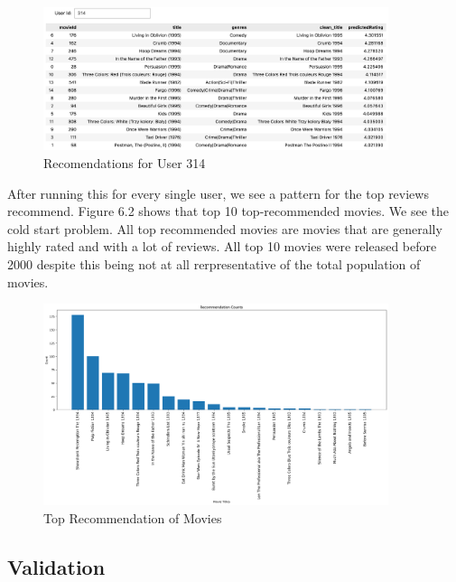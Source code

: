 \documentclass[12pt]{article}
\numberwithin{equation}{section}
\begin{document}
\begin{figure}[h!]
    \begin{minipage}[b]{01\linewidth}
         \centering
  	\includegraphics[width=0.9\textwidth]{314_recs}
  	\caption{Recomendations for User 314}
  	\label{fig:UN_degreeinfo}
    \end{minipage}
\end{figure}

After running this for every single user, we see a pattern for the top reviews recommend. Figure 6.2 shows that top 10 top-recommended movies. We see the cold start problem. All top recommended movies are movies that are generally highly rated and with a lot of reviews. All top 10 movies were released before 2000 despite this being not at all rerpresentative of the total population of movies.

\begin{figure}[h!]
    \begin{minipage}[b]{01\linewidth}
         \centering
  	\includegraphics[width=0.9\textwidth]{colab_filter.png}
  	\caption{Top Recommendation of Movies}
  	\label{fig:UN_degreeinfo}
    \end{minipage}
\end{figure}

\subsection{Validation}
\end{document}
